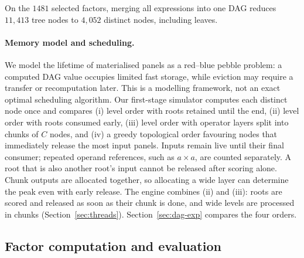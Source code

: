 \documentclass[11pt,a4paper]{article}
\begin{document}
On the $1481$ selected factors, merging all expressions into one DAG reduces $11{,}413$ tree nodes to $4{,}052$ distinct nodes, including leaves.
\paragraph{Memory model and scheduling.}
We model the lifetime of materialised panels as a red--blue pebble problem: a computed DAG value occupies limited fast storage, while eviction may require a transfer or recomputation later. This is a modelling framework, not an exact optimal scheduling algorithm. Our first-stage simulator computes each distinct node once and compares (i) level order with roots retained until the end, (ii) level order with roots consumed early, (iii) level order with operator layers split into chunks of $C$ nodes, and (iv) a greedy topological order favouring nodes that immediately release the most input panels. Inputs remain live until their final consumer; repeated operand references, such as $a\times a$, are counted separately. A root that is also another root's input cannot be released after scoring alone. Chunk outputs are allocated together, so allocating a wide layer can determine the peak even with early release. The engine combines (ii) and (iii): roots are scored and released as soon as their chunk is done, and wide levels are processed in chunks (Section~\ref{sec:threads}). Section~\ref{sec:dag-exp} compares the four orders.

\subsection{Factor computation and evaluation}
\label{sec:fc}
\end{document}
